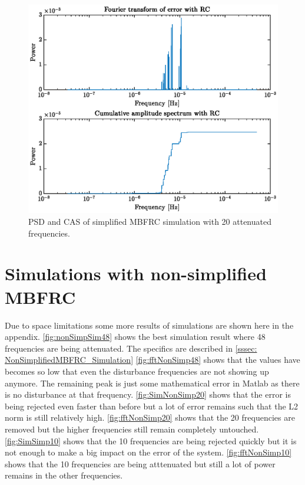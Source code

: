 \documentclass[journal]{IEEEtran}
\begin{document}
\begin{figure}
    \centering
    \includegraphics[width=1\linewidth]{figures/simple_MBFRC/FourierSimp10.eps}
    \caption{PSD and CAS of simplified MBFRC simulation with 20 attenuated frequencies.}
    \label{fig:fftSimp10}
\end{figure}
\section{Simulations with non-simplified MBFRC}\label{app:nonSimSim}
Due to space limitations some more results of simulations are shown here in the appendix. \autoref{fig:nonSimpSim48} shows the best simulation result where 48 frequencies are being attenuated. The specifics are described in \autoref{sssec: NonSimplifiedMBFRC_Simulation} \autoref{fig:fftNonSimp48} shows that the values have becomes so low that even the disturbance frequencies are not showing up anymore. The remaining peak is just some mathematical error in Matlab as there is no disturbance at that frequency. \autoref{fig:SimNonSimp20} shows that the error is being rejected even faster than before but a lot of error remains such that the L2 norm is still relatively high. \autoref{fig:fftNonSimp20} shows that the 20 frequencies are removed but the higher frequencies still remain completely untouched. \autoref{fig:SimSimp10} shows that the 10 frequencies are being rejected quickly but it is not enough to make a big impact on the error of the system. \autoref{fig:fftNonSimp10} shows that the 10 frequencies are being atttenuated but still a lot of power remains in the other frequencies.
\end{document}
